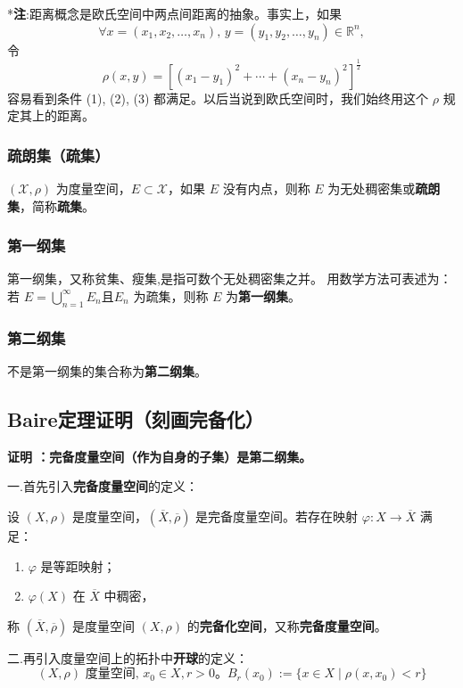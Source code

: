 \documentclass[12pt]{ctexart}
\begin{document}
 *\textbf{注}:距离概念是欧氏空间中两点间距离的抽象。事实上，如果
\[
\forall x = (x_1, x_2, \dots, x_n), \, y = (y_1, y_2, \dots, y_n) \in \mathbb{R}^n,
\]
令
\[
\rho(x, y) = \left[ (x_1 - y_1)^2 + \cdots + (x_n - y_n)^2 \right]^{\frac{1}{2}}
\]
容易看到条件 (1), (2), (3) 都满足。以后当说到欧氏空间时，我们始终用这个 $\rho$ 规定其上的距离。\cite{key12}

\subsubsection{疏朗集（疏集）}
$(\mathcal{X}, \rho)$ 为度量空间，$E \subset \mathcal{X}$，如果 $E$ 没有内点，则称 $E$ 为无处稠密集或\textbf{疏朗集}，简称\textbf{疏集}。\cite{13}

\subsubsection{第一纲集}
第一纲集，又称贫集、瘦集,是指可数个无处稠密集之并。
用数学方法可表述为：若 $E = \bigcup_{n=1}^\infty E_n$且$E_n$ 为疏集，则称 $E$ 为\textbf{第一纲集}。\cite{13}

\subsubsection{第二纲集}
不是第一纲集的集合称为\textbf{第二纲集}。

\subsection{Baire定理证明（刻画完备化）}
\textbf{证明 ：完备度量空间（作为自身的子集）是第二纲集。}

\vspace{0.3cm}
\noindent 一.首先引入\textbf{完备度量空间}的定义：

设 $(X, \rho)$ 是度量空间，$(\overline{X}, \overline{\rho})$ 是完备度量空间。若存在映射 $\varphi : X \to \overline{X}$ 满足：
\begin{enumerate}
    \item $\varphi$ 是等距映射；
    \item $\varphi(X)$ 在 $\overline{X}$ 中稠密，
\end{enumerate}
称 $(\overline{X}, \overline{\rho})$ 是度量空间 $(X, \rho)$ 的\textbf{完备化空间}，又称\textbf{完备度量空间}。\cite{17}

\vspace{0.3cm}
\noindent 二.再引入度量空间上的拓扑中\textbf{开球}的定义：
\[
(X, \rho) \text{ 度量空间, } x_0 \in X, r > 0 \text{。}
B_r(x_0) := \{x \in X \mid \rho(x, x_0) < r\}
\]
\end{document}

